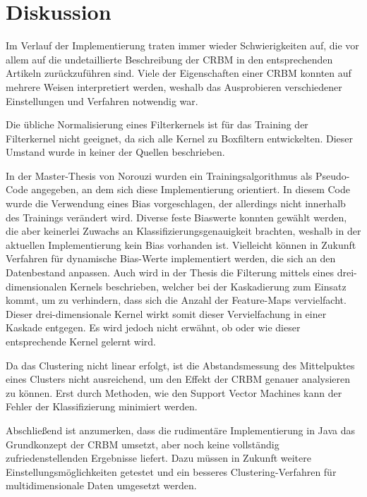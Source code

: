 \section{Diskussion}\label{discussion}
Im Verlauf der Implementierung traten immer wieder Schwierigkeiten auf, die vor allem auf die undetaillierte Beschreibung der CRBM in den entsprechenden Artikeln zurückzuführen sind. Viele der Eigenschaften einer CRBM konnten auf mehrere Weisen interpretiert werden, weshalb das Ausprobieren verschiedener Einstellungen und Verfahren notwendig war.

Die übliche Normalisierung eines Filterkernels ist für das Training der Filterkernel nicht geeignet, da sich alle Kernel zu Boxfiltern entwickelten. Dieser Umstand wurde in keiner der Quellen beschrieben.   

In der Master-Thesis von Norouzi wurden ein Trainingsalgorithmus als Pseudo-Code angegeben, an dem sich diese Implementierung orientiert. In diesem Code wurde die Verwendung eines Bias vorgeschlagen, der allerdings nicht innerhalb des Trainings verändert wird. Diverse feste Biaswerte konnten gewählt werden, die aber keinerlei Zuwachs an Klassifizierungsgenauigkeit brachten, weshalb in der aktuellen Implementierung kein Bias vorhanden ist. Vielleicht können in Zukunft Verfahren für dynamische Bias-Werte implementiert werden, die sich an den Datenbestand anpassen.
Auch wird in der Thesis die Filterung mittels eines drei-dimensionalen Kernels beschrieben, welcher bei der Kaskadierung zum Einsatz kommt,  um zu verhindern, dass  sich die Anzahl der Feature-Maps vervielfacht. Dieser drei-dimensionale Kernel wirkt somit dieser Vervielfachung in einer Kaskade entgegen. Es wird jedoch nicht erwähnt, ob oder wie dieser entsprechende Kernel gelernt wird. 

Da das Clustering nicht linear erfolgt, ist die Abstandsmessung des Mittelpuktes eines Clusters nicht ausreichend, um den Effekt der CRBM genauer analysieren zu können. Erst durch Methoden, wie den Support Vector Machines kann der Fehler der Klassifizierung minimiert werden.

Abschließend ist anzumerken, dass die rudimentäre Implementierung in Java das Grundkonzept der CRBM umsetzt, aber noch keine vollständig zufriedenstellenden Ergebnisse liefert. Dazu müssen in Zukunft weitere Einstellungsmöglichkeiten getestet und ein besseres Clustering-Verfahren für multidimensionale Daten umgesetzt werden.